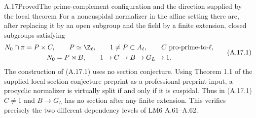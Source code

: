 \begin{statement}{A.17}{Proved}{The prime-complement configuration and the direction supplied by the local theorem}
For a noncuspidal normalizer in the affine setting there are,
after replacing it by an open subgroup and the field by a
finite extension, closed subgroups satisfying
\[
 \begin{gathered}
 N_0\cap\pi=P\times C,\qquad P\simeq\Z_\ell,
 \qquad 1\ne P\subset A_\ell,\qquad C\text{ pro-prime-to-}\ell,\\
 N_0=P\rtimes B,\qquad 1\to C\to B\to G_L\to1.
 \end{gathered}                                         \tag{A.17.1}
\]
The construction of (A.17.1) uses no section conjecture.
Using Theorem 1.1 of the supplied local section-conjecture
preprint as a professional-preprint input, a procyclic
normalizer is virtually split if and only if it is cuspidal.
Thus in (A.17.1) $C\ne1$ and $B\to G_L$ has no section
after any finite extension. This verifies precisely the two
different dependency levels of LM6 A.61--A.62.
\end{statement}
